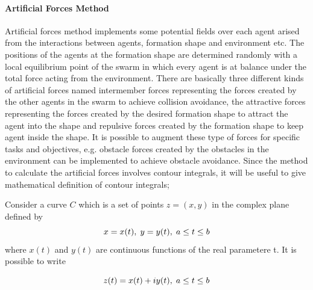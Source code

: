 \documentclass[twoside]{article}
\begin{document}
		\paragraph{Artificial Forces Method}
		Artificial forces method implements some potential fields over each agent arised from the interactions between agents, formation shape and environment etc. The positions of the agents at the formation shape  are determined randomly with a local equilibrium point of the swarm in which every agent is at balance under the total force acting from the environment. There are basically three different kinds of artificial forces named intermember forces representing the forces created by the other agents in the swarm to achieve collision avoidance, the attractive forces representing the forces created by the desired formation shape to attract the agent into the shape and repulsive forces created by the formation shape to keep agent inside the shape. It is possible to augment these type of forces for specific tasks and objectives, e.g. obstacle forces created by the obstacles in the environment can be implemented to achieve obstacle avoidance.
		Since the method to calculate the artificial forces involves contour integrals, it will be useful to give mathematical definition of contour integrals;
		
		Consider a curve $C$ which is a set of points $z = (x,y)$ in the complex plane defined by
		\begin{equation}
x = x(t),   \hspace{0.1cm} y = y(t),  \hspace{0.1cm} a\leq t \leq b
		\end{equation}
		where $x(t)$ and $y(t)$ are continuous functions of the real parametere t.  It is possible to write
		
		\begin{equation}
z(t) = x(t)+iy(t),   \hspace{0.1cm} a\leq t \leq b
		\end{equation}
		
\end{document}
